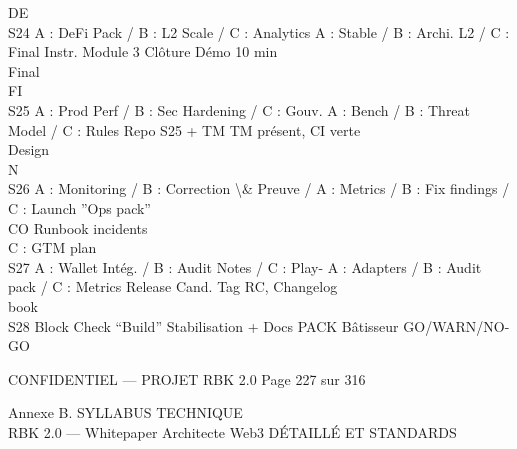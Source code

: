 \documentclass[12pt,landscape,a4paper]{article}
\newenvironment{confidential}
{\begin{tcolorbox}[
    colback=rbkred!5!white,
    colframe=rbkred!75!black,
    title=CONFIDENTIEL,
    fonttitle=\bfseries\color{white},
    coltitle=rbkred!75!black,
    breakable,
    enhanced,
    frame hidden,
    borderline west={2pt}{0pt}{rbkred!75!black}
]}
{\end{tcolorbox}}
\begin{document}
\vspace{0.5em}
\vspace{0.5em}
\vspace{0.5em}
\vspace{0.5em}
DE\\
S24    A : DeFi Pack / B : L2 Scale / C : Analytics A : Stable / B : Archi. L2 / C : Final Instr. Module 3 Clôture      Démo 10 min\\
Final\\
\vspace{0.5em}
\vspace{0.5em}
\vspace{0.5em}
\vspace{0.5em}
FI\\
S25    A : Prod Perf / B : Sec Hardening / C : Gouv. A : Bench / B : Threat Model / C : Rules      Repo S25 + TM        TM présent, CI verte\\
Design\\
\vspace{0.5em}
\vspace{0.5em}
\vspace{0.5em}
\vspace{0.5em}
N\\
S26    A : Monitoring / B : Correction \textbackslash{}& Preuve / A : Metrics / B : Fix findings / C : Launch ”Ops pack”\\
CO                                                                     Runbook incidents\\
C : GTM                                         plan\\
S27    A : Wallet Intég. / B : Audit Notes / C : Play- A : Adapters / B : Audit pack / C : Metrics Release Cand.        Tag RC, Changelog\\
book\\
S28    Block Check “Build”                             Stabilisation + Docs                        PACK Bâtisseur       GO/WARN/NO-GO\\
\vspace{0.5em}
\vspace{0.5em}
\vspace{0.5em}
\vspace{0.5em}
\begin{confidential}CONFIDENTIEL — PROJET RBK 2.0                                                Page 227 sur 316\end{confidential}
Annexe B. SYLLABUS TECHNIQUE\\
RBK 2.0 — Whitepaper Architecte Web3                                                                                    DÉTAILLÉ ET STANDARDS\\
\end{document}
